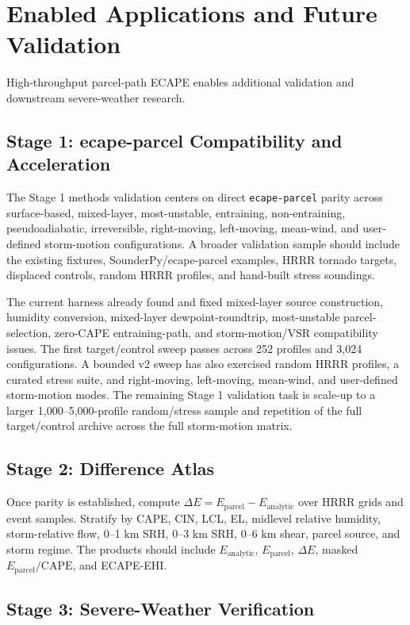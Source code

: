 \documentclass[11pt]{article}
\begin{document}
\section{Enabled Applications and Future Validation}

High-throughput parcel-path ECAPE enables additional validation and downstream severe-weather research.

\subsection{Stage 1: ecape-parcel Compatibility and Acceleration}

The Stage 1 methods validation centers on direct \texttt{ecape-parcel} parity across surface-based, mixed-layer, most-unstable, entraining, non-entraining, pseudoadiabatic, irreversible, right-moving, left-moving, mean-wind, and user-defined storm-motion configurations. A broader validation sample should include the existing fixtures, SounderPy/ecape-parcel examples, HRRR tornado targets, displaced controls, random HRRR profiles, and hand-built stress soundings.

The current harness already found and fixed mixed-layer source construction, humidity conversion, mixed-layer dewpoint-roundtrip, most-unstable parcel-selection, zero-CAPE entraining-path, and storm-motion/VSR compatibility issues. The first target/control sweep passes across 252 profiles and 3,024 configurations. A bounded v2 sweep has also exercised random HRRR profiles, a curated stress suite, and right-moving, left-moving, mean-wind, and user-defined storm-motion modes. The remaining Stage 1 validation task is scale-up to a larger 1,000--5,000-profile random/stress sample and repetition of the full target/control archive across the full storm-motion matrix.

\subsection{Stage 2: Difference Atlas}

Once parity is established, compute $\Delta E = E_{\mathrm{parcel}} - E_{\mathrm{analytic}}$ over HRRR grids and event samples. Stratify by CAPE, CIN, LCL, EL, midlevel relative humidity, storm-relative flow, 0--1 km SRH, 0--3 km SRH, 0--6 km shear, parcel source, and storm regime. The products should include $E_{\mathrm{analytic}}$, $E_{\mathrm{parcel}}$, $\Delta E$, masked $E_{\mathrm{parcel}}/\mathrm{CAPE}$, and ECAPE-EHI.

\subsection{Stage 3: Severe-Weather Verification}
\end{document}
